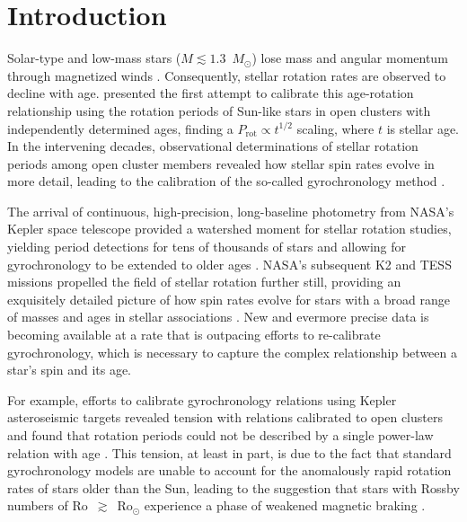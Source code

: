 \documentclass[trackchanges,twocolumn]{aastex631}
\newcommand{\rosun}{$\mathrm{Ro_{\odot}}$\xspace}
\newcommand{\msun}{$M_\odot$\xspace}
\begin{document}

\section{Introduction} \label{sec:intro}
Solar-type and low-mass stars ($M\lesssim1.3$~\msun) lose mass and angular momentum through magnetized winds \citep{Parker1958, WeberDavis1967, Mestel1968, Kawaler1988}. Consequently, stellar rotation rates are observed to decline with age. \citet{Skumanich1972} presented the first attempt to calibrate this age-rotation relationship using the rotation periods of Sun-like stars in open clusters with independently determined ages, finding a $P_\mathrm{rot} \propto t^{1/2}$ scaling, where $t$ is stellar age. In the intervening decades, observational determinations of stellar rotation periods among open cluster members revealed how stellar spin rates evolve in more detail, leading to the calibration of the so-called gyrochronology method \citep{Barnes2003, Barnes2007, Barnes2010, MamajekHillenbrand2008, Meibom2009, Angus2019}.

The arrival of continuous, high-precision, long-baseline photometry from NASA's Kepler space telescope \citep{Borucki2010} provided a watershed moment for stellar rotation studies, yielding period detections for tens of thousands of stars \citep[e.g.][]{Reinhold2013, McQuillan2014, Santos2021} and allowing for gyrochronology to be extended to older ages \citep[e.g.][]{Meibom2011, Meibom2015}. NASA's subsequent K2 \citep{Howell2014} and TESS \citep{Ricker2015} missions propelled the field of stellar rotation further still, providing an exquisitely detailed picture of how spin rates evolve for stars with a broad range of masses and ages in stellar associations \citep[e.g.][]{Douglas2016, Douglas2017, Douglas2019, Rebull2016, Rebull2017, Rebull2018, Rebull2020, Curtis2019a, Curtis2019b, Curtis2020}. New and evermore precise data is becoming available at a rate that is outpacing efforts to re-calibrate gyrochronology, which is necessary to capture the complex relationship between a star's spin and its age. 

For example, efforts to calibrate gyrochronology relations using Kepler asteroseismic targets revealed tension with relations calibrated to open clusters and found that rotation periods could not be described by a single power-law relation with age \citep{Angus2015}. This tension, at least in part, is due to the fact that standard gyrochronology models are unable to account for the anomalously rapid rotation rates of stars older than the Sun, leading to the suggestion that stars with Rossby numbers of Ro~$\gtrsim$~\rosun experience a phase of weakened magnetic braking \citep[WMB,][]{vanSaders2016}. 
\end{document}
